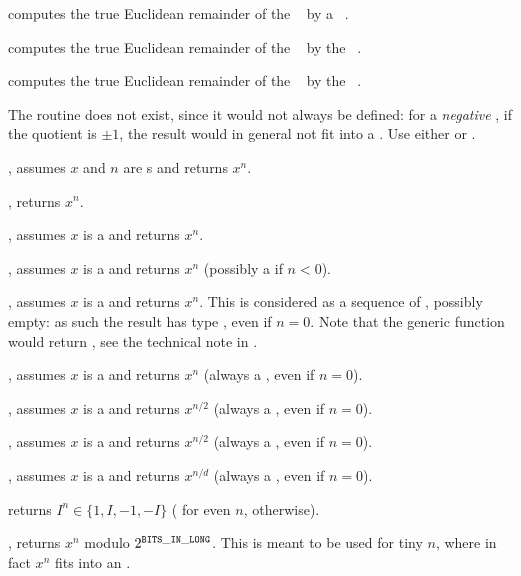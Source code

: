  computes the true Euclidean
remainder of the ~ by a ~.

 computes the true Euclidean
remainder of the ~ by the ~.

 computes the true Euclidean
remainder of the ~ by the ~.

The routine  does not exist, since it would not always be
defined: for a \emph{negative} , if the quotient is $\pm1$, the result
 would in general not fit into a . Use either
 or .


, assumes $x$ and $n$ are s and
returns $x^n$.

, returns $x^n$.

, assumes $x$ is a  and returns $x^n$.

, assumes $x$ is a  and returns $x^n$
(possibly a  if $n < 0$).

, assumes $x$ is a  and returns
$x^n$. This is considered as a sequence of , possibly empty:
as such the result has type , even if $n = 0$.
Note that the generic function  would return ,
see the technical note in .

, assumes $x$ is a  and returns $x^n$
(always a , even if $n = 0$).

, assumes $x$ is a  and returns
$x^{n/2}$ (always a , even if $n = 0$).

, assumes $x$ is a  and returns
$x^{n/2}$ (always a , even if $n = 0$).

, assumes $x$ is a  and
returns $x^{n/d}$ (always a , even if $n = 0$).

 returns $I^n\in\{1,I,-1,-I\}$ ( for even $n$,
 otherwise).

, returns $x^n$ modulo $2^{\tt BITS\_IN\_LONG}$. This is
meant to be used for tiny $n$, where in fact $x^n$ fits into an .

